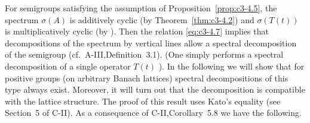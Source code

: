 %



For semigroups satisfying the assumption of Proposition~\ref{prop:c3-4.5}, the spectrum $\sigma(A)$ is additively cyclic (by Theorem~\ref{thm:c3-4.2}) and $\sigma(T(t))$ is multiplicatively cyclic
(by \citet[V.Theorem~4.4]{schaefer:1974}). Then the relation \eqref{eq:c3-4.7} implies that
decompositions of the spectrum by vertical lines allow a spectral
decomposition of the semigroup (cf.\ A-III,Definition~3.1). (One simply performs a spectral decomposition of a single operator $T(t)$ ). In the
following we will show that for positive groups (on arbitrary Banach
lattices) spectral decompositions of this type always exist. Moreover,
it will turn out that the decomposition is compatible with the lattice
structure. The proof of this result uses Kato's equality (see Section~5 of
C-II). As a consequence of C-II,Corollary~5.8 we have the following.

